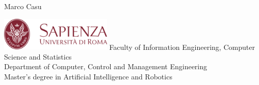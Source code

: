 \documentclass[10pt, letterpaper]{report}
\title{\titolo} %
\author{Marco Casu}
\date{\vspace{-5ex}}
\begin{document}
\begin{titlepage}
    
\begin{center}
   \HUGE Marco Casu\acc
\end{center}
\thispagestyle{empty}
\begin{figure}[h]
\end{figure}
\vfill 
\centering \includegraphics[width=0.4\textwidth ]{../../preamble/Stemma_sapienza.png} \acc
\centering \Large \color{sapienza}Faculty of Information Engineering, Computer Science and Statistics\\
Department of Computer, Control and Management Engineering\\
Master's degree in Artificial Intelligence and Robotics
\end{titlepage}
\end{document}

